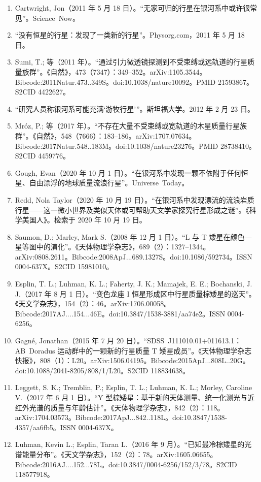 \begin{enumerate}
\item Cartwright, Jon（2011 年 5 月 18 日）。“无家可归的行星在银河系中或许很常见”。Science~Now。  
\item “没有恒星的行星：发现了一类新的行星”。Physorg.com，2011 年 5 月 18 日。  
\item Sumi, T.; 等（2011 年）。“通过引力微透镜探测到不受束缚或远轨道的行星质量族群”。《自然》，473（7347）：349--352。arXiv:1105.3544。Bibcode:2011Natur.473..349S。doi:10.1038/nature10092。PMID 21593867。S2CID 4422627。  
\item “研究人员称银河系可能充满‘游牧行星’”。斯坦福大学。2012 年 2 月 23 日。  
\item Mróz, P.; 等（2017 年）。“不存在大量不受束缚或宽轨道的木星质量行星族群”。《自然》，548（7666）：183--186。arXiv:1707.07634。Bibcode:2017Natur.548..183M。doi:10.1038/nature23276。PMID 28738410。S2CID 4459776。  
\item Gough, Evan（2020 年 10 月 1 日）。“在银河系中发现一颗不依附于任何恒星、自由漂浮的地球质量流浪行星”。Universe~Today。
\item Redd, Nola Taylor（2020 年 10 月 19 日）。“在银河系中发现漂流的流浪岩质行星——这一微小世界及类似天体或可帮助天文学家探究行星形成之谜”。《科学美国人》。检索于 2020 年 10 月 19 日。  
\item Saumon, D.; Marley, Mark S.（2008 年 12 月 1 日）。“L 与 T 矮星在颜色—星等图中的演化”。《天体物理学杂志》，689（2）：1327--1344。arXiv:0808.2611。Bibcode:2008ApJ...689.1327S。doi:10.1086/592734。ISSN 0004-637X。S2CID 15981010。  
\item Esplin, T. L.; Luhman, K. L.; Faherty, J. K.; Mamajek, E. E.; Bochanski, J. J.（2017 年 8 月 1 日）。“变色龙座 I 恒星形成区中行星质量棕矮星的巡天”。《天文学杂志》，154（2）：46。arXiv:1706.00058。Bibcode:2017AJ....154...46E。doi:10.3847/1538-3881/aa74e2。ISSN 0004-6256。  
\item Gagné, Jonathan（2015 年 7 月 20 日）。“SDSS~J111010.01+011613.1：AB~Doradus 运动群中的一颗新的行星质量 T 矮星成员”。《天体物理学杂志快报》，808（1）：L20。arXiv:1506.04195。Bibcode:2015ApJ...808L..20G。doi:10.1088/2041-8205/808/1/L20。S2CID 118834638。  
\item Leggett, S. K.; Tremblin, P.; Esplin, T. L.; Luhman, K. L.; Morley, Caroline V.（2017 年 6 月 1 日）。“Y 型棕矮星：基于新的天体测量、统一化测光与近红外光谱的质量与年龄估计”。《天体物理学杂志》，842（2）：118。arXiv:1704.03573。Bibcode:2017ApJ...842..118L。doi:10.3847/1538-4357/aa6fb5。ISSN 0004-637X。  
\item Luhman, Kevin L.; Esplin, Taran L.（2016 年 9 月）。“已知最冷棕矮星的光谱能量分布”。《天文学杂志》，152（2）：78。arXiv:1605.06655。Bibcode:2016AJ....152...78L。doi:10.3847/0004-6256/152/3/78。S2CID 118577918。  

\end{enumerate}
